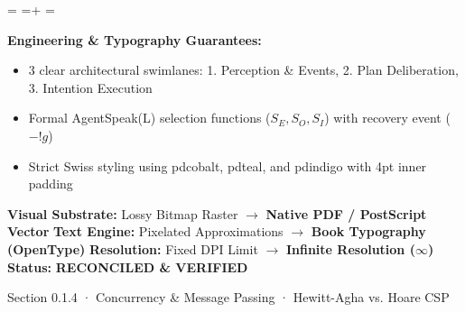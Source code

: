 \documentclass[10pt,a4paper,landscape]{article}
\newcommand{\pdautoscale}[2]{%
  \pdmaxh=#1\relax
  \pdmaxw=#2\relax
  \sbox{\pdscaledbox}{\usebox{\pdfigbox}}%
  \pdcurh=\dimexpr\ht\pdscaledbox+\dp\pdscaledbox\relax
  \pdcurw=\wd\pdscaledbox
  \ifdim\dimexpr\pdcurw * 100 / \pdmaxw\relax > \dimexpr\pdcurh * 100 / \pdmaxh\relax
    \resizebox{\pdmaxw}{!}{\usebox{\pdscaledbox}}%
  \else
    \resizebox{!}{\pdmaxh}{\usebox{\pdscaledbox}}%
  \fi
}
\begin{document}
\begin{minipage}[t]{0.492\linewidth}
  \begin{tcolorbox}[
    colback=pdcobalt!3,colframe=pdcobalt!85!black,arc=1.5pt,
    boxrule=0.7pt,top=1.5pt,bottom=1.5pt,left=4pt,right=4pt,
    title={\pdgrotesk\footnotesize\bfseries \color{white} B. Authoritative Native Vector Replacement \hfill \texttt{.tex / TikZ / PGF}}
  ]
    \begin{minipage}[c][8.3cm][c]{\linewidth}
      \centering
      \sbox{\pdfigbox}{}
      \pdautoscale{8.0cm}{\linewidth}
    \end{minipage}
    \tcblower
    \begin{minipage}[t][2.0cm][t]{\linewidth}
      \pdgrotesk\scriptsize
      \textbf{{\color{pdcobalt} Engineering \& Typography Guarantees:}}\\
      \begin{itemize}[leftmargin=9pt,itemsep=0pt,topsep=0.5pt,parsep=0pt]
        \item 3 clear architectural swimlanes: 1. Perception \& Events, 2. Plan Deliberation, 3. Intention Execution
        \item Formal AgentSpeak(L) selection functions ($S_E, S_O, S_I$) with recovery event ($-!g$)
        \item Strict Swiss styling using pdcobalt, pdteal, and pdindigo with 4pt inner padding
      \end{itemize}
    \end{minipage}
  \end{tcolorbox}
\end{minipage}

\vspace*{0.05cm}
\noindent
\begin{tcolorbox}[
  colback=hhpaper,colframe=hhgray!35,arc=1.5pt,boxrule=0.4pt,
  top=1.5pt,bottom=1.5pt,left=6pt,right=6pt
]
  \pdgrotesk\scriptsize
  \noindent
  \textbf{Visual Substrate:} Lossy Bitmap Raster $\rightarrow$ \textbf{\color{pdcobalt}Native PDF / PostScript Vector}\hfill
  \textbf{Text Engine:} Pixelated Approximations $\rightarrow$ \textbf{\color{pdcobalt}Book Typography (OpenType)}\hfill
  \textbf{Resolution:} Fixed DPI Limit $\rightarrow$ \textbf{\color{pdcobalt}Infinite Resolution ($\infty$)}\hfill
  \textbf{Status:} \textbf{\color{pdteal}RECONCILED \& VERIFIED}
\end{tcolorbox}
\clearpage

\noindent
\begin{minipage}[t]{\linewidth}
  \hfill
  {\pdgrotesk\footnotesize\color{hhgray} Section 0.1.4 · Concurrency \& Message Passing · Hewitt-Agha vs. Hoare CSP}\\
  \vspace*{0.03cm}
  \noindent{\color{hhgray!40}\rule{\linewidth}{0.5pt}}
\end{minipage}
\end{document}
